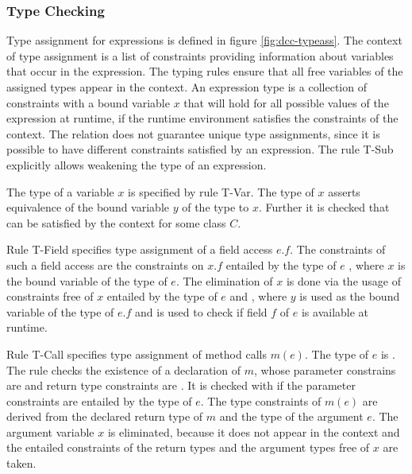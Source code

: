 \subsubsection{Type Checking}
Type assignment for expressions is defined in figure \ref{fig:dcc-typeass}.
The context of type assignment is a list of constraints providing information
about variables that occur in the expression.
The typing rules ensure that all free variables of the assigned types
appear in the context.
An expression type  is a collection of constraints 
with a bound variable $x$
that will hold for all possible values of the expression at runtime,
if the runtime environment satisfies the constraints of the context.
The relation does not guarantee unique type assignments,
since it is possible to have different constraints satisfied by an expression.
The rule T-Sub explicitly allows weakening the type of an expression.

The type of a variable $x$ is specified by rule T-Var.
The type of $x$ asserts equivalence of the bound variable $y$ of the type to $x$.
Further it is checked that  can be satisfied by the context for some class $C$.

Rule T-Field specifies type assignment of a field access $e.f$.
The constraints of such a field access are the constraints on $x.f$
entailed by the type of $e$
, where $x$ is the bound variable of the type of $e$.
The elimination of $x$ is done via the usage of
constraints free of $x$ entailed by the type of $e$ and ,
where $y$ is used as the bound variable of the type of $e.f$
and  is used to check if
field $f$ of $e$ is available at runtime.

Rule T-Call specifies type assignment of method calls $m(e)$.
The type of $e$ is .
The rule checks the existence of a declaration of $m$,
whose parameter constrains are  and return type constraints are .
It is checked with  if
the parameter constraints are entailed by the type of $e$.
The type constraints of $m(e)$ are derived from the declared return type of $m$
and the type of the argument $e$.
The argument variable $x$ is eliminated, because it does not appear in the context
and the entailed constraints of the return types and the argument types
free of $x$ are taken.

